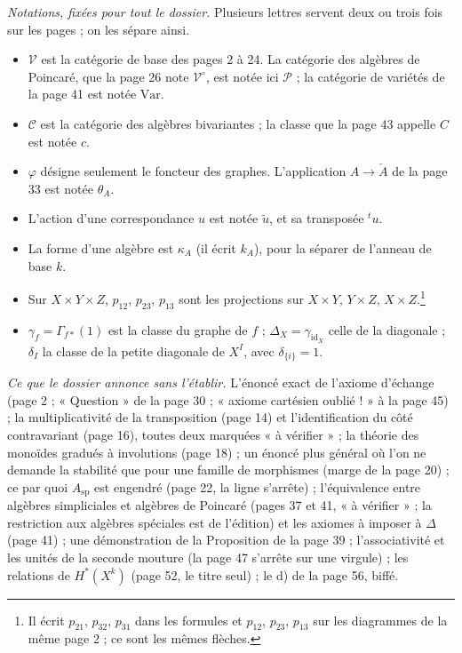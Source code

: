 \documentclass[11pt,a4paper]{article}
\begin{document}
\emph{Notations, fixées pour tout le dossier.} Plusieurs lettres servent deux
ou trois fois sur les pages ; on les sépare ainsi.

\begin{itemize}
  \item $\mathcal{V}$ est la catégorie de base des pages 2 à 24. La catégorie
  des algèbres de Poincaré, que la page 26 note $\mathcal{V}^{\circ}$, est
  notée ici $\mathcal{P}$ ; la catégorie de variétés de la page 41 est notée
  $\mathrm{Var}$.
  \item $\mathcal{C}$ est la catégorie des algèbres bivariantes ; la classe que
  la page 43 appelle $C$ est notée $c$.
  \item $\varphi$ désigne seulement le foncteur des graphes. L'application
  $A \to \check{A}$ de la page 33 est notée $\theta_{A}$.
  \item L'action d'une correspondance $u$ est notée $\tilde{u}$, et sa
  transposée ${}^{t}u$.
  \item La forme d'une algèbre est $\kappa_{A}$ (il écrit $k_{A}$), pour la
  séparer de l'anneau de base $k$.
  \item Sur $X \times Y \times Z$, $p_{12}$, $p_{23}$, $p_{13}$ sont les
  projections sur $X \times Y$, $Y \times Z$, $X \times Z$.\footnote{Il écrit
  $p_{21}$, $p_{32}$, $p_{31}$ dans les formules et $p_{12}$, $p_{23}$,
  $p_{13}$ sur les diagrammes de la même page 2 ; ce sont les mêmes flèches.}
  \item $\gamma_{f} = \Gamma_{f*}(1)$ est la classe du graphe de $f$ ;
  $\Delta_{X} = \gamma_{\mathrm{id}_{X}}$ celle de la diagonale ; $\delta_{I}$
  la classe de la petite diagonale de $X^{I}$, avec $\delta_{\{i\}} = 1$.
\end{itemize}

\emph{Ce que le dossier annonce sans l'établir.} L'énoncé exact de l'axiome
d'échange (page 2 ; « Question » de la page 30 ; « axiome cartésien oublié ! »
à la page 45) ; la multiplicativité de la transposition (page 14) et
l'identification du côté contravariant (page 16), toutes deux marquées « à
vérifier » ; la théorie des monoïdes gradués à involutions (page 18) ; un
énoncé plus général où l'on ne demande la stabilité que pour une famille de
morphismes (marge de la page 20) ; ce par quoi $A_{\mathrm{sp}}$ est engendré
(page 22, la ligne s'arrête) ; l'équivalence entre algèbres simpliciales
et algèbres de Poincaré (pages 37 et 41, « à vérifier » ; la restriction aux
algèbres spéciales est de l'édition) et les
axiomes à imposer à $\Delta$ (page 41) ; une démonstration de la Proposition
de la page 39 ; l'associativité et les unités de la seconde mouture (la page
47 s'arrête sur une virgule) ; les relations de $H^{*}(X^{k})$ (page 52, le
titre seul) ; le d) de la page 56, biffé.
\end{document}

